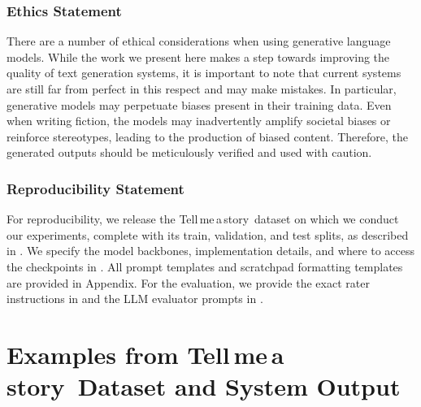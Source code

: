 \documentclass{article}
\newcommand{\tellmeastory}{{\sc Tell$\,$me$\,$a$\,$story}}
\begin{document}

\subsubsection*{Ethics Statement}
There are a number of ethical considerations when using generative language models. While the work we present here makes a step towards improving the quality of text generation systems, it is important to note that current systems are still far from perfect in this respect and may make mistakes. In particular, generative models may perpetuate biases present in their training data. Even when writing fiction, the models may inadvertently amplify societal biases or reinforce stereotypes, leading to the production of biased content. Therefore, the generated outputs should be meticulously verified and used with caution. 


\subsubsection*{Reproducibility Statement}
For reproducibility, we release the \tellmeastory\ dataset on which we conduct our experiments, complete with its train, validation, and test splits, as described in . We specify the model backbones, implementation details, and where to access the checkpoints in . All prompt templates and scratchpad formatting templates are provided in Appendix. For the evaluation, we provide the exact rater instructions in  and the LLM evaluator prompts in .



\newpage
\appendix
\section{Examples from \tellmeastory\ Dataset and System Output}
\label{appendix:fictionstories}
\end{document}
